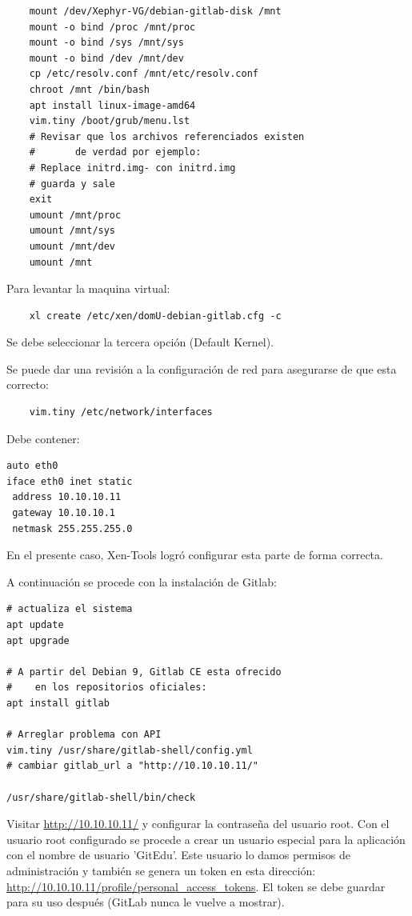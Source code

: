 \begin{lstlisting}
	mount /dev/Xephyr-VG/debian-gitlab-disk /mnt
	mount -o bind /proc /mnt/proc
	mount -o bind /sys /mnt/sys
	mount -o bind /dev /mnt/dev
	cp /etc/resolv.conf /mnt/etc/resolv.conf
	chroot /mnt /bin/bash
	apt install linux-image-amd64
	vim.tiny /boot/grub/menu.lst
	# Revisar que los archivos referenciados existen
	#		de verdad por ejemplo:
	# Replace initrd.img- con initrd.img
    # guarda y sale
	exit
	umount /mnt/proc            
	umount /mnt/sys 
	umount /mnt/dev 
	umount /mnt	
\end{lstlisting}

Para levantar la maquina virtual:

\begin{lstlisting}
	xl create /etc/xen/domU-debian-gitlab.cfg -c
\end{lstlisting}

Se debe seleccionar la tercera opción (Default Kernel).

Se puede dar una revisión a la configuración de red para asegurarse de que esta correcto:

\begin{lstlisting}
	vim.tiny /etc/network/interfaces
\end{lstlisting}

Debe contener:

\begin{lstlisting}
auto eth0
iface eth0 inet static
 address 10.10.10.11
 gateway 10.10.10.1
 netmask 255.255.255.0
\end{lstlisting}

En el presente caso, Xen-Tools logró configurar esta parte de forma correcta.

A continuación se procede con la instalación de Gitlab:

\begin{lstlisting}
# actualiza el sistema
apt update
apt upgrade

# A partir del Debian 9, Gitlab CE esta ofrecido
#    en los repositorios oficiales:
apt install gitlab

# Arreglar problema con API
vim.tiny /usr/share/gitlab-shell/config.yml
# cambiar gitlab_url a "http://10.10.10.11/"

/usr/share/gitlab-shell/bin/check
\end{lstlisting}

Visitar \url{http://10.10.10.11/} y configurar la contraseña del usuario root. Con el usuario root configurado se procede a crear un usuario especial para la aplicación con el nombre de usuario 'GitEdu'. Este usuario lo damos permisos de administración y también se genera un token en esta dirección: \url{http://10.10.10.11/profile/personal_access_tokens}. El token se debe guardar para su uso después (GitLab nunca le vuelve a mostrar).

